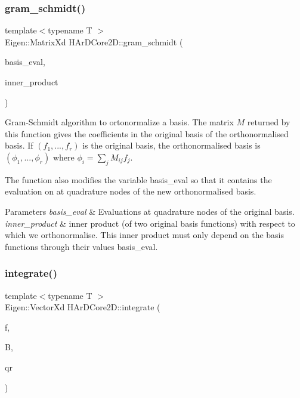 \subsubsection{\texorpdfstring{gram\+\_\+schmidt()}{gram\_schmidt()}}
{\footnotesize\ttfamily template$<$typename T $>$ \\
Eigen\+::\+Matrix\+Xd H\+Ar\+D\+Core2\+D\+::gram\+\_\+schmidt (\begin{DoxyParamCaption}\item[{boost\+::multi\+\_\+array$<$ T, 2 $>$ \&}]{basis\+\_\+eval,  }\item[{const std\+::function$<$ double(size\+\_\+t, size\+\_\+t)$>$ \&}]{inner\+\_\+product }\end{DoxyParamCaption})}

Gram-\/\+Schmidt algorithm to ortonormalize a basis. The matrix $M$ returned by this function gives the coefficients in the original basis of the orthonormalised basis. If $(f_1,...,f_r)$ is the original basis, the orthonormalised basis is $(\phi_1,...,\phi_r)$ where $\phi_i = \sum_j M_{ij}f_j$.

The function also modifies the variable basis\+\_\+eval so that it contains the evaluation on at quadrature nodes of the new orthonormalised basis. 
\begin{DoxyParams}{Parameters}
{\em basis\+\_\+eval} & Evaluations at quadrature nodes of the original basis. \\
\hline
{\em inner\+\_\+product} & inner product (of two original basis functions) with respect to which we orthonormalise. This inner product must only depend on the basis functions through their values basis\+\_\+eval. \\
\hline
\end{DoxyParams}
\mbox{\label{group__Basis_ga8b3e4c44e672ad940f3dd12f2b0ae8cc}} 
\subsubsection{\texorpdfstring{integrate()}{integrate()}}
{\footnotesize\ttfamily template$<$typename T $>$ \\
Eigen\+::\+Vector\+Xd H\+Ar\+D\+Core2\+D\+::integrate (\begin{DoxyParamCaption}\item[{const std\+::function$<$ T(const Vector\+Rd \&)$>$ \&}]{f,  }\item[{const boost\+::multi\+\_\+array$<$ T, 2 $>$ \&}]{B,  }\item[{const Quadrature\+Rule \&}]{qr }\end{DoxyParamCaption})}



